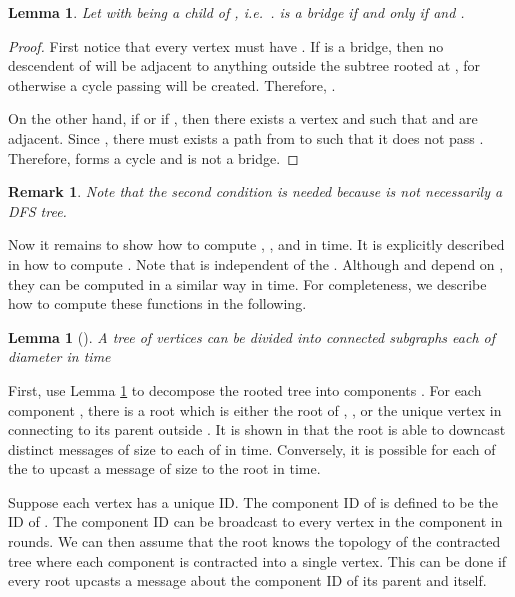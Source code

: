 \documentclass[11pt]{article}
\newtheorem{lemma}[theorem]{Lemma}
\newtheorem{remark}[theorem]{Remark}
\begin{document}
\begin{lemma}Let  with  being a child of , i.e.~.  is a bridge if and only if  and .\end{lemma}
\begin{proof}
First notice that every vertex  must have . If  is a bridge, then no descendent of  will be adjacent to anything outside the subtree rooted at , for otherwise a cycle passing  will be created. Therefore, .

On the other hand, if  or if , then there exists a vertex  and  such that  and  are adjacent. Since , there must exists a path from  to  such that it does not pass . Therefore,  forms a cycle and  is not a bridge.
\end{proof}
\begin{remark}Note that the second condition  is needed because  is not necessarily a DFS tree. \end{remark}

Now it remains to show how to compute , , and  in  time. It is explicitly described in \cite{Thurimella97} how to compute . Note that  is independent of the . Although  and  depend on , they can be computed in a similar way in  time. For completeness, we describe how to compute these functions in the following.

\begin{lemma}[\cite{GKP93,KP95}]\label{lem:decompose} A tree of  vertices can be divided into  connected subgraphs each of diameter  in  time\end{lemma}

First, use Lemma \ref{lem:decompose} to decompose the rooted tree  into components . For each component , there is a root  which is either the root of , , or the unique vertex in  connecting to its parent outside . It is shown in \cite{Peleg} that the root  is able to downcast distinct messages of size  to each of  in  time. Conversely, it is possible for each of the  to upcast a message of size  to the root  in  time. 

Suppose each vertex has a unique ID. The component ID of  is defined to be the ID of . The component ID can be broadcast to every vertex in the component in  rounds. We can then assume that the root  knows the topology of the contracted tree where each component is contracted into a single vertex. This can be done if every root  upcasts a message about the component ID of its parent and itself.
\end{document}

